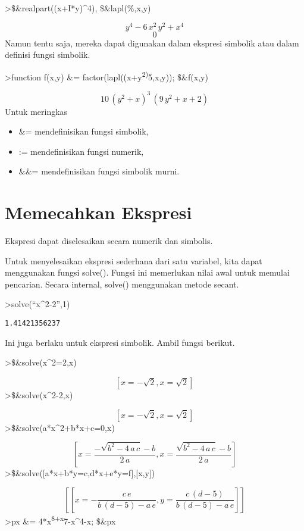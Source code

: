 \documentclass[
]{book}
\begin{document}
\textgreater\$\&realpart((x+I*y)\^{}4), \$\&lapl(\%,x,y)

\[y^4-6\,x^2\,y^2+x^4\] \[0\]Namun tentu saja, mereka dapat digunakan dalam ekspresi simbolik atau dalam definisi fungsi simbolik.

\textgreater function f(x,y) \&= factor(lapl((x+y\textsuperscript{2)}5,x,y)); \$\&f(x,y)

\[10\,\left(y^2+x\right)^3\,\left(9\,y^2+x+2\right)\]Untuk meringkas

\begin{itemize}
\item
  \&= mendefinisikan fungsi simbolik,
\item
  := mendefinisikan fungsi numerik,
\item
  \&\&= mendefinisikan fungsi simbolik murni.
\end{itemize}

\chapter{Memecahkan Ekspresi}\label{memecahkan-ekspresi}

Ekspresi dapat diselesaikan secara numerik dan simbolis.

Untuk menyelesaikan ekspresi sederhana dari satu variabel, kita dapat menggunakan fungsi solve(). Fungsi ini memerlukan nilai awal untuk memulai pencarian. Secara internal, solve() menggunakan metode secant.

\textgreater solve(``x\^{}2-2'',1)

\begin{verbatim}
1.41421356237
\end{verbatim}

Ini juga berlaku untuk ekspresi simbolik. Ambil fungsi berikut.

\textgreater\$\&solve(x\^{}2=2,x)

\[\left[ x=-\sqrt{2} , x=\sqrt{2} \right]\]\textgreater\$\&solve(x\^{}2-2,x)

\[\left[ x=-\sqrt{2} , x=\sqrt{2} \right]\]\textgreater\$\&solve(a*x\^{}2+b*x+c=0,x)

\[\left[x=\frac{-\sqrt{b^2-4\,a\,c}-b}{2\,a} , x=\frac{\sqrt{b^2-4\,a\,c}-b}{2\,a} \right]\]\textgreater\$\&solve({[}a*x+b*y=c,d*x+e*y=f{]},{[}x,y{]})

\[\left[ \left[ x=-\frac{c\,e}{b\,\left(d-5\right)-a\,e} , y=\frac{c\,\left(d-5\right)}{b\,\left(d-5\right)-a\,e} \right]  \right]\]\textgreater px \&= 4*x\textsuperscript{8+x}7-x\^{}4-x; \$\&px
\end{document}
